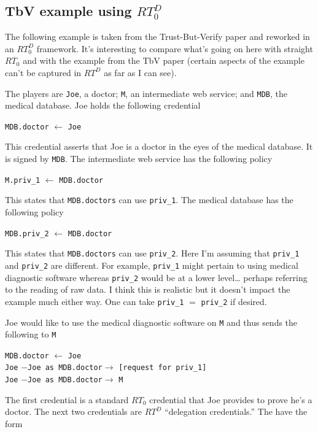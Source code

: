 \documentclass{article}
\begin{document}
\subsection{TbV example using $RT_0^D$}

The following example is taken from the Trust-But-Verify paper and reworked in an $RT_0^D$
framework. It's interesting to compare what's going on here with straight $RT_0$ and with the
example from the TbV paper (certain aspects of the example can't be captured in $RT^D$ as far as
I can see).

The players are \texttt{Joe}, a doctor; \texttt{M}, an intermediate web service; and
\texttt{MDB}, the medical database. Joe holds the following credential

\texttt{MDB.doctor} $\leftarrow$ \texttt{Joe}

This credential asserts that Joe is a doctor in the eyes of the medical database. It is signed
by \texttt{MDB}. The intermediate web service has the following policy

\texttt{M.priv\_1} $\leftarrow$ \texttt{MDB.doctor}

This states that \texttt{MDB.doctors} can use \texttt{priv\_1}. The medical database has the
following policy

\texttt{MDB.priv\_2} $\leftarrow$ \texttt{MDB.doctor}

This states that \texttt{MDB.doctors} can use \texttt{priv\_2}. Here I'm assuming that
\texttt{priv\_1} and \texttt{priv\_2} are different. For example, \texttt{priv\_1} might pertain
to using medical diagnostic software whereas \texttt{priv\_2} would be at a lower level\ldots
perhaps referring to the reading of raw data. I think this is realistic but it doesn't impact
the example much either way. One can take \texttt{priv\_1} $=$ \texttt{priv\_2} if desired.

Joe would like to use the medical diagnostic software on \texttt{M} and thus sends the following
to \texttt{M}

\texttt{MDB.doctor} $\leftarrow$ \texttt{Joe} \\
\texttt{Joe} $-$\texttt{Joe as MDB.doctor}$\rightarrow$ \texttt{[request for priv\_1]} \\
\texttt{Joe} $-$\texttt{Joe as MDB.doctor}$\rightarrow$ \texttt{M}

The first credential is a standard $RT_0$ credential that Joe provides to prove he's a doctor.
The next two credentials are $RT^D$ ``delegation credentials.'' The have the form
\end{document}
